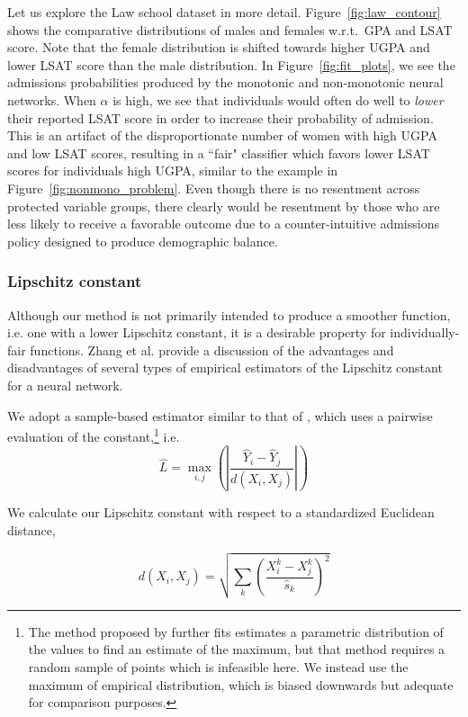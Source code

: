         Let us explore the Law school dataset in more detail. Figure~\ref{fig:law_contour} shows the comparative distributions of males and females w.r.t.\ GPA and LSAT score.  Note that the female distribution is shifted towards higher UGPA and lower LSAT score than the male distribution. In Figure~\ref{fig:fit_plots}, we see the admissions probabilities produced by the monotonic and non-monotonic neural networks. When $\alpha$ is high, we see that individuals would often do well to \textit{lower} their reported LSAT score in order to increase their probability of admission.  This is an artifact of the disproportionate number of women with high UGPA and low LSAT scores, resulting in a ``fair" classifier which favors lower LSAT scores for individuals high UGPA, similar to the example in Figure~\ref{fig:nonmono_problem}.  Even though there is no resentment across protected variable groups, there clearly would be resentment by those who are less likely to receive a favorable outcome due to a counter-intuitive admissions policy designed to produce demographic balance. 

    \subsubsection{Lipschitz constant}
        
        Although our method is not primarily intended to produce a smoother function, i.e. one with a lower Lipschitz constant, it is a desirable property for individually-fair functions.  Zhang et al. \cite{zhang2019recurjac} provide a discussion of the advantages and disadvantages of several types of empirical estimators of the Lipschitz constant for a neural network.
        
        We adopt a sample-based estimator similar to that of \cite{wood1996estimation}, which uses a pairwise evaluation of the constant,\footnote{The method proposed by \cite{wood1996estimation} further fits estimates a parametric distribution of the values to find an estimate of the maximum, but that method requires a random sample  of points which is infeasible here.  We instead use the maximum of empirical distribution, which is biased downwards but adequate for comparison purposes.} i.e. $$ \hat{L} = \max\limits_{i, j} \left( \left| \frac{\hat{Y}_i - \hat{Y}_j}{ d(X_i, X_j) } \right|\right)$$  
        
        We calculate our Lipschitz constant with respect to a standardized Euclidean distance, 
        
        $$d(X_i, X_j) = \sqrt{\sum\limits_k \left( \frac{X_i^k - X_j^k}{\hat{s}_k}\right)^2}$$
        
